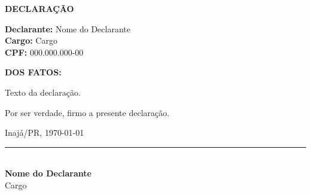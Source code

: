 \documentclass[12pt,a4paper]{article}
\newcommand{\municipio}{Inajá}
\newcommand{\uf}{PR}
\newcommand{\tipoDocumento}{DECLARAÇÃO}
\newcommand{\declarante}{Nome do Declarante}
\newcommand{\declaranteCargo}{Cargo}
\newcommand{\declaranteCPF}{000.000.000-00}
\newcommand{\textoDeclaracao}{Texto da declaração.}
\newcommand{\localData}{\municipio/\uf, \today}
\begin{document}
\begin{center}
  {\large\textbf{\tipoDocumento}}
\end{center}

\vspace{0.8cm}

\noindent
\textbf{Declarante:} \declarante \\
\textbf{Cargo:} \declaranteCargo \\
\textbf{CPF:} \declaranteCPF

\vspace{0.5cm}

\noindent
\textbf{DOS FATOS:}

\vspace{0.3cm}

\noindent
\textoDeclaracao

\vspace{0.8cm}

\noindent
Por ser verdade, firmo a presente declaração.

\vspace{1.5cm}

\begin{flushright}
  \localData
\end{flushright}

\vspace{1.5cm}

\begin{center}
  \rule{6cm}{0.4pt}\\
  \textbf{\declarante}\\
  \declaranteCargo
\end{center}
\end{document}
